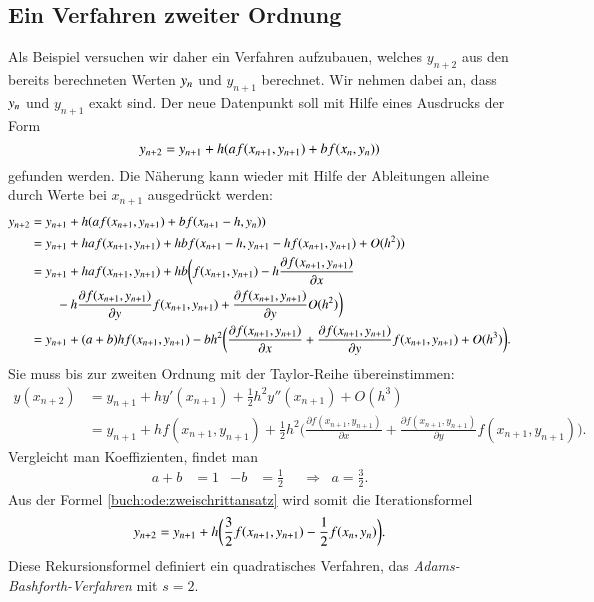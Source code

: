 \subsection{Ein Verfahren zweiter Ordnung
\label{buch:ode:subsection:zweiteordnung}}
Als Beispiel versuchen wir daher ein Verfahren aufzubauen, welches
$y_{n+2}$ aus den bereits berechneten Werten $y_{n\mathstrut}$ und
$y_{n+1}$ berechnet.
Wir nehmen dabei an, dass $y_{n\mathstrut}$ und $y_{n+1}$ exakt
sind.
Der neue Datenpunkt soll mit Hilfe eines Ausdrucks der Form
\begin{equation}
y_{n+2}
=
y_{n+1} + h(af(x_{n+1},y_{n+1}) + b f(x_{n\mathstrut},y_{n\mathstrut}))
\label{buch:ode:zweischrittansatz}
\end{equation}
gefunden werden.
Die Näherung kann wieder mit Hilfe der Ableitungen alleine
durch Werte bei $x_{n+1}$ ausgedrückt werden:
\begin{align*}
y_{n+2}
&=
y_{n+1}+h(af(x_{n+1}, y_{n+1}) + bf(x_{n+1}-h, y_{n\mathstrut}))
\\
&=
y_{n+1}+haf(x_{n+1}, y_{n+1}) + hbf(x_{n+1}-h, y_{n+1} - h f(x_{n+1},y_{n+1}) + O(h^2))
\\
&=
y_{n+1}+haf(x_{n+1}, y_{n+1}) + hb
\biggl(
f(x_{n+1},y_{n+1})
-h \frac{\partial f(x_{n+1},y_{n+1})}{\partial x}
\\
&\qquad
-h
\frac{\partial f(x_{n+1},y_{n+1})}{\partial y}
f(x_{n+1},y_{n+1})
+ 
\frac{\partial f(x_{n+1},y_{n+1})}{\partial y}
O(h^2)
\biggr)
\\
&=
y_{n+1}
+ (a+b)hf(x_{n+1},y_{n+1})
- bh^2\biggl(
\frac{\partial f(x_{n+1},y_{n+1})}{\partial x}
+
\frac{\partial f(x_{n+1},y_{n+1})}{\partial y}
f(x_{n+1},y_{n+1})
+O(h^3)
\biggr).
\end{align*}
Sie muss bis zur zweiten Ordnung mit der Taylor-Reihe übereinstimmen:
\begin{align*}
y(x_{n+2})
&=
y_{n+1} + hy'(x_{n+1}) + \frac12h^2 y''(x_{n+1})+O(h^3)
\\
&=
y_{n+1}+hf(x_{n+1},y_{n+1})+\frac12h^2\biggl(
\frac{\partial f(x_{n+1},y_{n+1})}{\partial x}
+
\frac{\partial f(x_{n+1},y_{n+1})}{\partial y}
f(x_{n+1},y_{n+1})
\biggr).
\end{align*}
Vergleicht man Koeffizienten, findet man
\[
\begin{aligned}
a+b&=1&-b&=\frac12&&\Rightarrow&a=\frac32.
\end{aligned}
\]
Aus der Formel \eqref{buch:ode:zweischrittansatz} wird somit die
Iterationsformel
\begin{equation}
y_{n+2}
=
y_{n+1}+h\biggl(\frac32f(x_{n+1},y_{n+1})
- \frac12 f(x_{n\mathstrut},y_{n\mathstrut})\biggr).
\label{buch:ode:mehrschritt:2}
\end{equation}
Diese Rekursionsformel definiert ein quadratisches Verfahren, das
{\em Adams-Bashforth-Verfahren} mit $s=2$.

